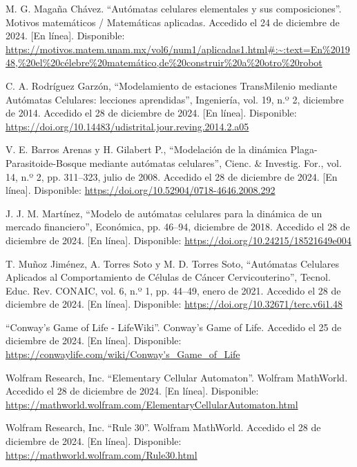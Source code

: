 \documentclass[12pt,twoside]{article}
\begin{document}
	\clearpage
	\begin{thebibliography}{99}
		M. G. Magaña Chávez. ``Autómatas celulares elementales y sus composiciones''. Motivos matemáticos / Matemáticas aplicadas. Accedido el 24 de diciembre de 2024. [En línea]. Disponible: \url{https://motivos.matem.unam.mx/vol6/num1/aplicadas1.html#:~:text=En%201948,%20el%20célebre%20matemático,de%20construir%20a%20otro%20robot}
		
		C. A. Rodríguez Garzón, ``Modelamiento de estaciones TransMilenio mediante Autómatas Celulares: lecciones aprendidas'', Ingeniería, vol. 19, n.º 2, diciembre de 2014. Accedido el 28 de diciembre de 2024. [En línea]. Disponible: \url{https://doi.org/10.14483/udistrital.jour.reving.2014.2.a05}
		
		V. E. Barros Arenas y H. Gilabert P., ``Modelación de la dinámica Plaga-Parasitoide-Bosque mediante autómatas celulares'', Cienc. \& Investig. For., vol. 14, n.º 2, pp. 311–323, julio de 2008. Accedido el 28 de diciembre de 2024. [En línea]. Disponible: \url{https://doi.org/10.52904/0718-4646.2008.292}
		
		J. J. M. Martínez, ``Modelo de autómatas celulares para la dinámica de un mercado financiero'', Económica, pp. 46–94, diciembre de 2018. Accedido el 28 de diciembre de 2024. [En línea]. Disponible: \url{https://doi.org/10.24215/18521649e004}
		
		T. Muñoz Jiménez, A. Torres Soto y M. D. Torres Soto, ``Autómatas Celulares Aplicados al Comportamiento de Células de Cáncer Cervicouterino'', Tecnol. Educ. Rev. CONAIC, vol. 6, n.º 1, pp. 44–49, enero de 2021. Accedido el 28 de diciembre de 2024. [En línea]. Disponible: \url{https://doi.org/10.32671/terc.v6i1.48}
		
		``Conway's Game of Life - LifeWiki''. Conway's Game of Life. Accedido el 25 de diciembre de 2024. [En línea]. Disponible: \url{https://conwaylife.com/wiki/Conway's_Game_of_Life}
		
		Wolfram Research, Inc. ``Elementary Cellular Automaton''. Wolfram MathWorld. Accedido el 28 de diciembre de 2024. [En línea]. Disponible: \url{https://mathworld.wolfram.com/ElementaryCellularAutomaton.html}
		
		Wolfram Research, Inc. ``Rule 30''. Wolfram MathWorld. Accedido el 28 de diciembre de 2024. [En línea]. Disponible: \url{https://mathworld.wolfram.com/Rule30.html}
		
	\end{thebibliography}
	
\end{document}
